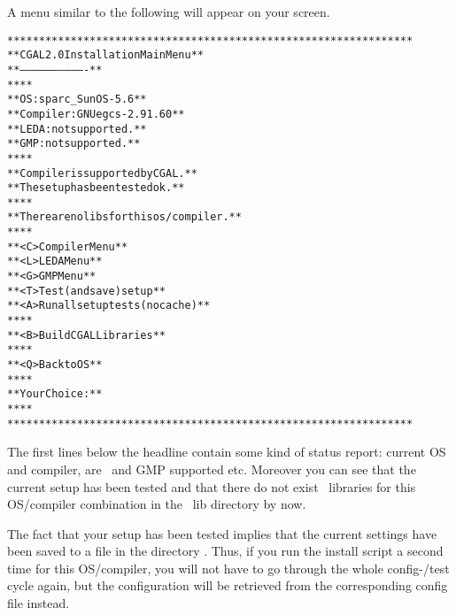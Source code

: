 A menu similar to the following will appear on your screen.

{\ccTexHtml{\scriptsize}{} \label{pic:main-menu}
\begin{alltt}
  ****************************************************************
  **              CGAL 2.0 Installation Main Menu               **
  **              -------------------------------               **
  **                                                            **
  **   OS:                  sparc_SunOS-5.6                     **
  **   Compiler:            GNU egcs-2.91.60                    **
  **   LEDA:                not supported.                      **
  **   GMP:                 not supported.                      **
  **                                                            **
  **   Compiler is supported by CGAL.                           **
  **   The setup has been tested ok.                            **
  **                                                            **
  **   There are no libs for this os/compiler.                  **
  **                                                            **
  **   <C>  Compiler Menu                                       **
  **   <L>  LEDA Menu                                           **
  **   <G>  GMP Menu                                            **
  **   <T>  Test (and save) setup                               **
  **   <A>  Run all setup tests (no cache)                      **
  **                                                            **
  **   <B>  Build CGAL Libraries                                **
  **                                                            **
  **   <Q>  Back to OS                                          **
  **                                                            **
  **   Your Choice:                                             **
  **                                                            **
  ****************************************************************
\end{alltt}}

The first lines below the headline contain some kind of status report:
current OS and compiler, are \leda\ and GMP supported etc. Moreover
you can see that the current setup has been tested and that there do
not exist \cgal\ libraries for this OS/compiler combination in the
\cgal\ lib directory by now. 

The fact that your setup has been tested implies that the current
settings have been saved to a file in the directory \cgalinstconfdir.
Thus, if you run the install script a second time for this
OS/compiler, you will not have to go through the whole config-/test
cycle again, but the configuration will be retrieved from the
corresponding config file instead.


